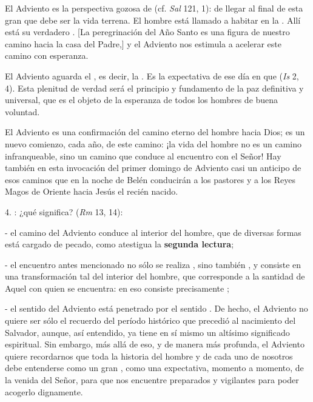 \begin{body}
					El Adviento es la perspectiva gozosa de  (cf. \emph{Sal} 121, 1): de llegar al final de esta gran  que debe ser la vida terrena. El hombre está llamado a habitar en la . Allí está su verdadero . {[}La peregrinación del Año Santo es una figura de nuestro camino hacia la casa del Padre,{]} y el Adviento nos estimula a acelerar este camino con esperanza. 
					
					El Adviento aguarda el , es decir, la . Es la expectativa de ese día en que  (\emph{Is} 2, 4). Esta plenitud de verdad será el principio y fundamento de la paz definitiva y universal, que es el objeto de la esperanza de todos los hombres de buena voluntad. 
					
					El Adviento es una confirmación del camino eterno del hombre hacia Dios; es un nuevo comienzo, cada año, de este camino: ¡la vida del hombre no es un camino infranqueable, sino un camino que conduce al encuentro con el Señor! Hay también en esta invocación del primer domingo de Adviento casi un anticipo de esos caminos que en la noche de Belén conducirán a los pastores y a los Reyes Magos de Oriente hacia Jesús el recién nacido. 
					
					4. : ¿qué significa?  (\emph{Rm} 13, 14): 
					
					- el camino del Adviento conduce al interior del hombre, que de diversas formas está cargado de pecado, como atestigua la \textbf{segunda lectura}; 
					
					- el encuentro antes mencionado no sólo se realiza , sino también , y consiste en una transformación tal del interior del hombre, que corresponde a la santidad de Aquel con quien se encuentra: en eso consiste precisamente ; 
					
					- el sentido  del Adviento está penetrado por el sentido . De hecho, el Adviento no quiere ser sólo el recuerdo del período histórico que precedió al nacimiento del Salvador, aunque, así entendido, ya tiene en sí mismo un altísimo significado espiritual. Sin embargo, más allá de eso, y de manera más profunda, el Adviento quiere recordarnos que toda la historia del hombre y de cada uno de nosotros debe entenderse como un gran , como una expectativa, momento a momento, de la venida del Señor, para que nos encuentre preparados y vigilantes para poder acogerlo dignamente. 
					

\end{body}
